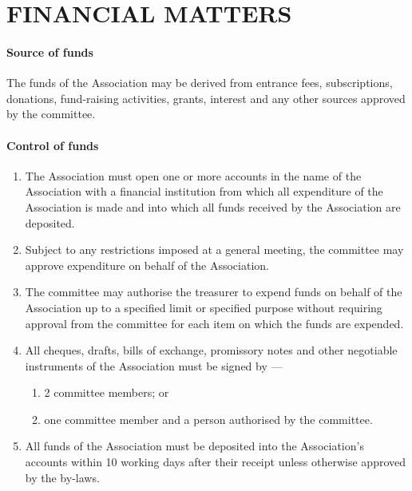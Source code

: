 \documentclass[../constitution.tex]{subfiles}
\begin{document}
\hypertarget{part-7-financial-matters}{%
  \part{FINANCIAL MATTERS}\label{part-7-financial-matters}}

\hypertarget{source-of-funds}{%
  \subsection{Source of funds}\label{source-of-funds}}

The funds of the Association may be derived from entrance fees, subscriptions, donations, fund-raising activities, grants, interest and any other sources approved by the committee.

\hypertarget{control-of-funds}{%
  \subsection{Control of funds}\label{control-of-funds}}

\begin{enumerate}

  \item The Association must open one or more accounts in the name of the Association with a financial institution from which all expenditure of the Association is made and into which all funds received by the Association are deposited.
  \item Subject to any restrictions imposed at a general meeting, the committee may approve expenditure on behalf of the Association.
  \item The committee may authorise the treasurer to expend funds on behalf of the Association up to a specified limit or specified purpose without requiring approval from the committee for each item on which the funds are expended.
  \item All cheques, drafts, bills of exchange, promissory notes and other negotiable instruments of the Association must be signed by ---

        \begin{enumerate}

          \item 2 committee members; or
          \item one committee member and a person authorised by the committee.
        \end{enumerate}
  \item All funds of the Association must be deposited into the Association's accounts within 10 working days after their receipt unless otherwise approved by the by-laws.
\end{enumerate}
\end{document}

